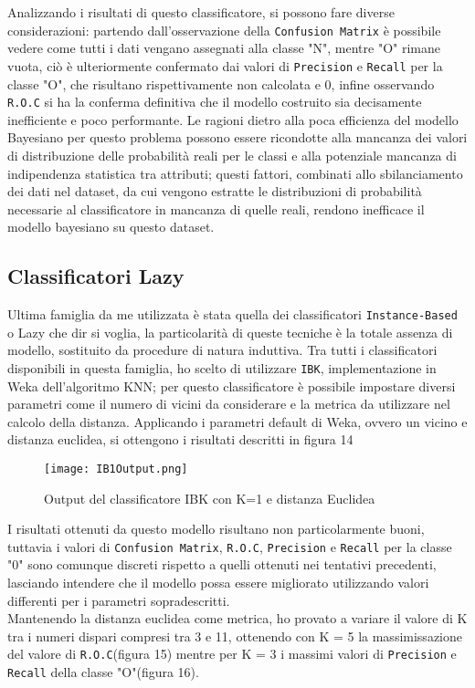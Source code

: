 Analizzando i risultati di questo classificatore, si possono fare diverse considerazioni: partendo dall'osservazione della \texttt{Confusion Matrix} è possibile vedere come tutti i dati vengano assegnati alla classe "N", mentre "O" rimane vuota, ciò è ulteriormente confermato dai valori di \texttt{Precision} e \texttt{Recall} per la classe "O", che risultano rispettivamente non calcolata e 0, infine osservando \texttt{R.O.C} si ha la conferma definitiva che il modello costruito sia decisamente inefficiente e poco performante.
Le ragioni dietro alla poca efficienza del modello Bayesiano per questo problema possono essere ricondotte alla mancanza dei valori di distribuzione delle probabilità reali per le classi e alla potenziale mancanza di indipendenza statistica tra attributi; questi fattori, combinati allo sbilanciamento dei dati nel dataset, da cui vengono estratte le distribuzioni di probabilità necessarie al classificatore in mancanza di quelle reali, rendono inefficace il modello bayesiano su questo dataset. 

  \subsection{Classificatori Lazy}
  Ultima famiglia da me utilizzata è stata quella dei classificatori \texttt{Instance-Based} o Lazy che dir si voglia, la particolarità di queste tecniche è la totale assenza di modello, sostituito da procedure di natura induttiva.
  Tra tutti i classificatori disponibili in questa famiglia, ho scelto di utilizzare \texttt{IBK}, implementazione in Weka dell'algoritmo KNN; per questo classificatore è possibile impostare diversi parametri come il numero di vicini da considerare e la metrica da utilizzare nel calcolo della distanza.
  Applicando i parametri default di Weka, ovvero un vicino e distanza euclidea, si ottengono i risultati descritti in figura 14
  
  \begin{figure}[H]
  	\texttt{[image: IB1Output.png]}
  	\caption{Output del classificatore IBK con K=1 e distanza Euclidea}
  \end{figure}

I risultati ottenuti da questo modello risultano non particolarmente buoni, tuttavia i valori di \texttt{Confusion Matrix}, \texttt{R.O.C}, \texttt{Precision} e \texttt{Recall} per la classe "0" sono comunque discreti rispetto a quelli ottenuti nei tentativi precedenti, lasciando intendere che il modello possa essere migliorato utilizzando valori differenti per i parametri sopradescritti.\\
Mantenendo la distanza euclidea come metrica, ho provato a variare il valore di K tra i numeri dispari compresi tra 3 e 11, ottenendo con K = 5 la massimissazione del valore di \texttt{R.O.C}(figura 15) mentre per K = 3 i massimi valori di \texttt{Precision} e \texttt{Recall} della classe "O"(figura 16).

